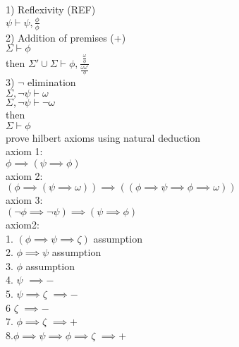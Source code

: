 \documentclass[12pt,oneside,fleqn]{article}
\theoremstyle{definition}
\begin{document}
1) Reflexivity (REF) \\
$\psi \vdash \psi, \frac{\phi}{\phi}$ \\
2) Addition of premises (+) \\
$\Sigma \vdash \phi$ \\
then $\Sigma' \cup \Sigma \vdash \phi, \frac{ \frac{\omega}{\phi}}{\frac{\omega \omega'}{\phi}}$ \\
3) $\neg$ elimination \\
$\Sigma, \neg \psi \vdash \omega$ \\
$\Sigma, \neg \psi \vdash \neg \omega$ \\
then \\
$\Sigma \vdash \phi$ \\

prove hilbert axioms using natural deduction \\

axiom 1: \\
$\phi \implies (\psi \implies \phi)$ \\
axiom 2: \\
$(\phi \implies (\psi \implies \omega)) \implies ((\phi \implies \psi \implies \phi \implies \omega))$ \\
axiom 3: \\
$(\neg \phi \implies \neg \psi) \implies (\psi \implies \phi)$ \\
 
axiom2: \\
1. $(\phi \implies \psi \implies \zeta)$ assumption \\
2.     $\phi \implies \psi$ assumption \\
3.			$\phi$ assumption \\
4. 			$\psi$ $\implies -$ \\
5.			$\psi \implies \zeta$ $\implies -$ \\
6			$\zeta$ $\implies -$ \\
7.		$\phi \implies \zeta$ $\implies +$ \\
8.$\phi \implies \psi \implies \phi \implies \zeta$ $\implies +$ \\
\end{document}
